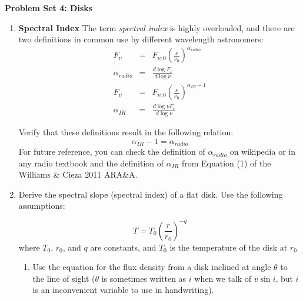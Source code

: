 \documentclass{article}
\begin{document}
\noindent\textbf{Problem Set 4: Disks}








\begin{enumerate}
    \item \textbf{Spectral Index}
            The term \textit{spectral index} is highly overloaded, and there are two
            definitions in common use by different wavelength astronomers:
            \begin{eqnarray}
                F_\nu  & =&  F_{\nu,0} \left(\frac{\nu}{\nu_0}\right)^{\alpha_{radio}} \\
                \alpha_{radio} & = &  \frac{d \log {F_\nu}}{d \log \nu}\\
                F_\nu  & =&  F_{\nu,0} \left(\frac{\nu}{\nu_0}\right)^{\alpha_{IR} - 1} \\
                \alpha_{IR} & = & \frac{d \log \nu F_\nu}{d \log \nu}
            \end{eqnarray}

            Verify that these definitions result in the following relation:
            $$\alpha_{IR} - 1= \alpha_{radio}$$
            For future reference, you can check the definition of
            $\alpha_{radio}$ on wikipedia or in any radio textbook and the
            definition of $\alpha_{IR}$ from Equation (1) of the Williams \&
            Cieza 2011 ARA\&A.
\item
    Derive the spectral slope (spectral index) of a flat disk.  Use the following assumptions:

    \begin{equation}
        \label{eqn:tpower}
        T = T_0 \left(\frac{r}{r_0}\right)^{-q}
    \end{equation}
    where $T_0$, $r_0$, and $q$ are constants, and $T_0$ is the temperature of the disk at $r_0$

    \begin{enumerate}
        \item Use the equation for the flux density from a disk inclined at
            angle $\theta$ to the line of sight ($\theta$ is sometimes written
            as $i$ when we talk of $v \sin i$, but $i$ is an inconvenient
            variable to use in handwriting).


\end{enumerate}
\end{enumerate}
\end{document}
